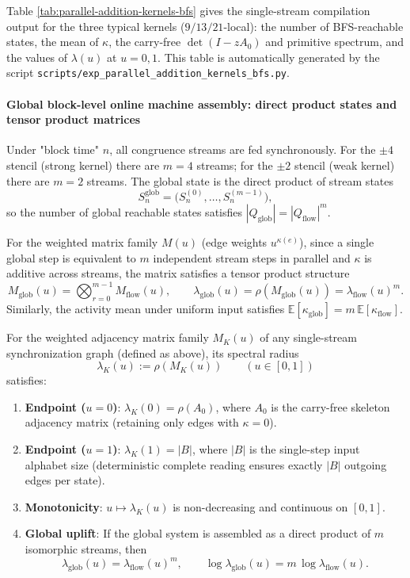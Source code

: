 Table \ref{tab:parallel-addition-kernels-bfs} gives the single-stream compilation output for the three typical kernels ($9/13/21$-local): the number of BFS-reachable states, the mean of $\kappa$, the carry-free $\det(I-zA_0)$ and primitive spectrum, and the values of $\lambda(u)$ at $u=0,1$. This table is automatically generated by the script \texttt{scripts/exp\_parallel\_addition\_kernels\_bfs.py}.


\paragraph{Global block-level online machine assembly: direct product states and tensor product matrices}
Under "block time" $n$, all congruence streams are fed synchronously. For the $\pm 4$ stencil (strong kernel) there are $m=4$ streams; for the $\pm 2$ stencil (weak kernel) there are $m=2$ streams. The global state is the direct product of stream states
\[
S_n^{\mathrm{glob}}=\bigl(S_n^{(0)},\dots,S_n^{(m-1)}\bigr),
\]
so the number of global reachable states satisfies $|Q_{\mathrm{glob}}|=|Q_{\mathrm{flow}}|^m$.

For the weighted matrix family $M(u)$ (edge weights $u^{\kappa(e)}$), since a single global step is equivalent to $m$ independent stream steps in parallel and $\kappa$ is additive across streams, the matrix satisfies a tensor product structure
\[
M_{\mathrm{glob}}(u)=\bigotimes_{r=0}^{m-1} M_{\mathrm{flow}}(u),
\qquad
\lambda_{\mathrm{glob}}(u)=\rho(M_{\mathrm{glob}}(u))=\lambda_{\mathrm{flow}}(u)^m.
\]
Similarly, the activity mean under uniform input satisfies $\mathbb{E}[\kappa_{\mathrm{glob}}]=m\,\mathbb{E}[\kappa_{\mathrm{flow}}]$.

\begin{proposition}\label{prop:lambda-endpoints-monotone-uplift}
For the weighted adjacency matrix family $M_K(u)$ of any single-stream synchronization graph (defined as above), its spectral radius
\[
\lambda_K(u):=\rho(M_K(u))\qquad (u\in[0,1])
\]
satisfies:
\begin{enumerate}
  \item \textbf{Endpoint ($u=0$)}: $\lambda_K(0)=\rho(A_0)$, where $A_0$ is the carry-free skeleton adjacency matrix (retaining only edges with $\kappa=0$).
  \item \textbf{Endpoint ($u=1$)}: $\lambda_K(1)=|B|$, where $|B|$ is the single-step input alphabet size (deterministic complete reading ensures exactly $|B|$ outgoing edges per state).
  \item \textbf{Monotonicity}: $u\mapsto \lambda_K(u)$ is non-decreasing and continuous on $[0,1]$.
  \item \textbf{Global uplift}: If the global system is assembled as a direct product of $m$ isomorphic streams, then
  \[
  \lambda_{\mathrm{glob}}(u)=\lambda_{\mathrm{flow}}(u)^m,
  \qquad
  \log\lambda_{\mathrm{glob}}(u)=m\,\log\lambda_{\mathrm{flow}}(u).
  \]
\end{enumerate}
\end{proposition}

